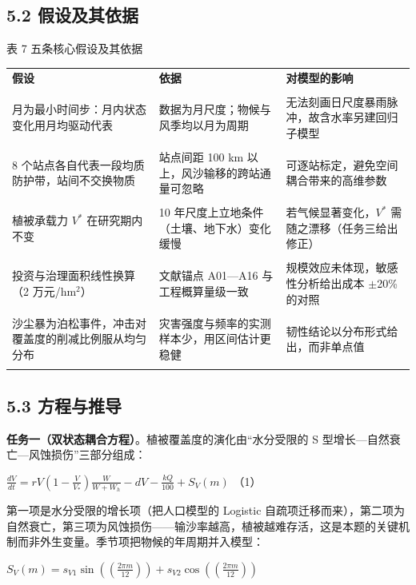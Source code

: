 \documentclass[11pt,a4paper]{ctexart}
\begin{document}
\subsection*{5.2 假设及其依据}
表 7  五条核心假设及其依据


\begin{table}[H]\centering\small\setlength{\parskip}{2pt}
\begin{tabularx}{\textwidth}{|X|X|X|}
\toprule
\textbf{假设} & \textbf{依据} & \textbf{对模型的影响} \\\\
\midrule
月为最小时间步：月内状态变化用月均驱动代表 & 数据为月尺度；物候与风季均以月为周期 & 无法刻画日尺度暴雨脉冲，故含水率另建回归子模型 \\\\
8 个站点各自代表一段均质防护带，站间不交换物质 & 站点间距 100 km 以上，风沙输移的跨站通量可忽略 & 可逐站标定，避免空间耦合带来的高维参数 \\\\
植被承载力 $V^{*}$ 在研究期内不变 & 10 年尺度上立地条件（土壤、地下水）变化缓慢 & 若气候显著变化，$V^{*}$ 需随之漂移（任务三给出修正） \\\\
投资与治理面积线性换算（2 万元/hm$^{2}$） & 文献锚点 A01—A16 与工程概算量级一致 & 规模效应未体现，敏感性分析给出成本 $\pm$20\% 的对照 \\\\
沙尘暴为泊松事件，冲击对覆盖度的削减比例服从均匀分布 & 灾害强度与频率的实测样本少，用区间估计更稳健 & 韧性结论以分布形式给出，而非单点值 \\\\
\bottomrule
\end{tabularx}
\end{table}

\subsection*{5.3 方程与推导}
\textbf{任务一（双状态耦合方程）}。植被覆盖度的演化由“水分受限的 S 型增长—自然衰亡—风蚀损伤”三部分组成：

$\frac{dV}{dt}=rV\left(1-\frac{V}{V_{*}}\right)\frac{W}{W+W_{h}}-dV-\frac{kQ}{100}+S_{V}\left(m\right)​$  （1）

第一项是水分受限的增长项（把人口模型的 Logistic 自疏项迁移而来），第二项为自然衰亡，第三项为风蚀损伤——输沙率越高，植被越难存活，这是本题的关键机制而非外生变量。季节项把物候的年周期并入模型：

$S_{V}\left(m\right)​=s_{V1}\sin\left(\left(\frac{2{\pi}m}{12}\right)\right)+s_{V2}\cos\left(\left(\frac{2{\pi}m}{12}\right)\right)$
\end{document}
